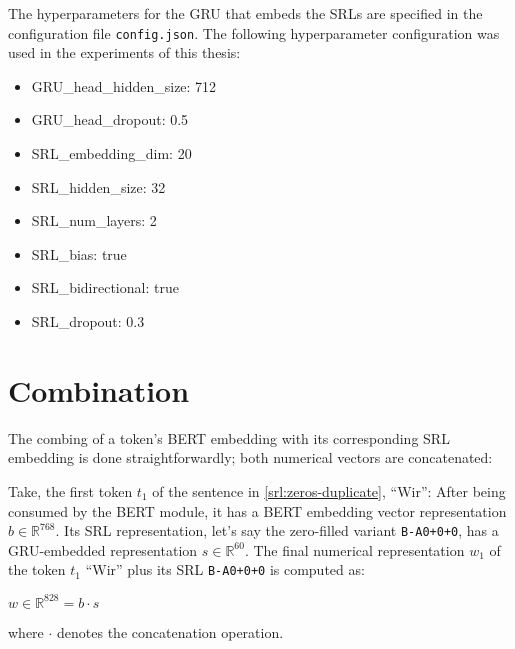 \begin{tcolorbox}[
  colback=blue!5!white,
  colframe=blue!75!black,
  title={\centering Code}]

  The hyperparameters for the GRU that embeds the SRLs are specified in the configuration file
  \texttt{config.json}. The following hyperparameter configuration was used in the experiments
  of this thesis:

  \begin{itemize}
    \itemsep0em
    \item[] GRU\_head\_hidden\_size: 712
	  \item[] GRU\_head\_dropout: 0.5
	  \item[] SRL\_embedding\_dim: 20
	  \item[] SRL\_hidden\_size: 32
	  \item[] SRL\_num\_layers: 2
	  \item[] SRL\_bias: true
	  \item[] SRL\_bidirectional: true
	  \item[] SRL\_dropout: 0.3
  \end{itemize}

\end{tcolorbox}



\section{Combination}

The combing of a token's BERT embedding with its corresponding SRL embedding is done
straightforwardly; both numerical vectors are concatenated:

Take, the first token $t_1$ of the sentence in \ref{srl:zeros-duplicate},
``Wir'': After being consumed by the BERT module, it has a BERT embedding
vector representation $b \in \mathbb{R}^{768}$. Its SRL representation,
let's say the zero-filled variant \texttt{B-A0+0+0}, has a GRU-embedded
representation $s \in \mathbb{R}^{60}$. The final numerical representation
$w_1$ of the token $t_1$ ``Wir'' plus its SRL \texttt{B-A0+0+0} is computed
as:

$w \in \mathbb{R}^{828} = b \cdot  s$

where $\cdot$ denotes the concatenation operation.

